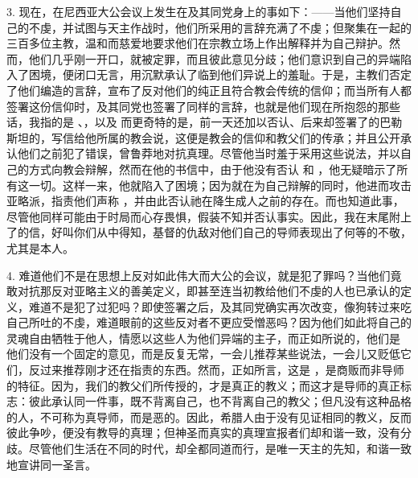3. 现在，在尼西亚大公会议上发生在及其同党身上的事如下：——当他们坚持自己的不虔，并试图与天主作战时，他们所采用的言辞充满了不虔；但聚集在一起的三百多位主教，温和而慈爱地要求他们在宗教立场上作出解释并为自己辩护。然而，他们几乎刚一开口，就被定罪，而且彼此意见分歧；他们意识到自己的异端陷入了困境，便闭口无言，用沉默承认了临到他们异说上的羞耻。于是，主教们否定了他们编造的言辞，宣布了反对他们的纯正且符合教会传统的信仰；而当所有人都签署这份信仰时，及其同党也签署了同样的言辞，也就是他们现在所抱怨的那些话，我指的是 、，以及  而更奇特的是，前一天还加以否认、后来却签署了的巴勒斯坦的，写信给他所属的教会说，这便是教会的信仰和教父们的传承；并且公开承认他们之前犯了错误，曾鲁莽地对抗真理。尽管他当时羞于采用这些说法，并以自己的方式向教会辩解，然而在他的书信中，由于他没有否认  和 ，他无疑暗示了所有这一切。这样一来，他就陷入了困境；因为就在为自己辩解的同时，他进而攻击亚略派，指责他们声称 ，并由此否认祂在降生成人之前的存在。而也知道此事，尽管他同样可能由于时局而心存畏惧，假装不知并否认事实。因此，我在末尾附上了的信，好叫你们从中得知，基督的仇敌对他们自己的导师表现出了何等的不敬，尤其是本人。\par

4. 难道他们不是在思想上反对如此伟大而大公的会议，就是犯了罪吗？当他们竟敢对抗那反对亚略主义的善美定义，即甚至连当初教给他们不虔的人也已承认的定义，难道不是犯了过犯吗？即使签署之后，及其同党确实再次改变，像狗转过来吃自己所吐的不虔，难道眼前的这些反对者不更应受憎恶吗？因为他们如此将自己的灵魂自由牺牲于他人，情愿以这些人为他们异端的主子，而正如所说的，他们是  他们没有一个固定的意见，而是反复无常，一会儿推荐某些说法，一会儿又贬低它们，反过来推荐刚才还在指责的东西。然而，正如所言，这是 ，是商贩而非导师的特征。因为，我们的教父们所传授的，才是真正的教义；而这才是导师的真正标志：彼此承认同一件事，既不背离自己，也不背离自己的教父；但凡没有这种品格的人，不可称为真导师，而是恶的。因此，希腊人由于没有见证相同的教义，反而彼此争吵，便没有教导的真理；但神圣而真实的真理宣报者们却和谐一致，没有分歧。尽管他们生活在不同的时代，却全都同道而行，是唯一天主的先知，和谐一致地宣讲同一圣言。\par

